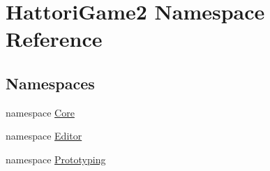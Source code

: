 \hypertarget{namespace_hattori_game2}{}\section{Hattori\+Game2 Namespace Reference}
\label{namespace_hattori_game2}
\subsection*{Namespaces}
\begin{DoxyCompactItemize}
\item 
namespace \hyperlink{namespace_hattori_game2_1_1_core}{Core}
\item 
namespace \hyperlink{namespace_hattori_game2_1_1_editor}{Editor}
\item 
namespace \hyperlink{namespace_hattori_game2_1_1_prototyping}{Prototyping}
\end{DoxyCompactItemize}
